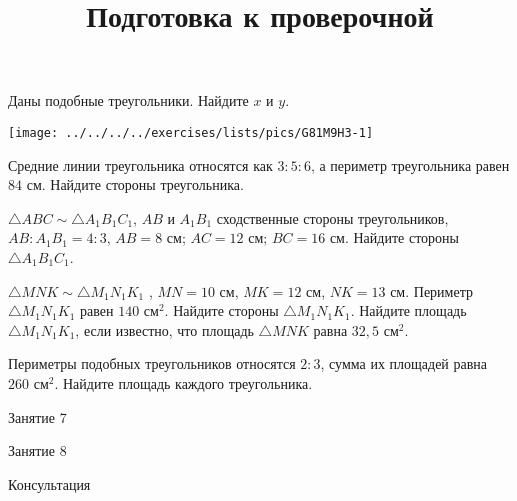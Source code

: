 \begin{homework}[number=3]
	\begin{listofex}
		\item 
		\begin{minipage}[t]{\bodywidth}
			Даны подобные треугольники. Найдите \( x \) и \( y \).
		\end{minipage}
		\hspace{0.02\linewidth}
		\begin{minipage}[t]{\picwidth}
			\texttt{[image: ../../../../exercises/lists/pics/G81M9H3-1]}
		\end{minipage}
		\item Средние линии треугольника относятся как \( 3 : 5 : 6 \), а периметр треугольника равен \( 84 \) см. Найдите стороны треугольника.
		\item \( \triangle ABC \sim \triangle A_1B_1C_1 \), \( AB \) и \( A_1B_1  \) сходственные стороны треугольников, \( AB:A_1B_1=4:3 \), \( AB=8 \) см; \( AC=12 \) см; \( BC=16 \) см. Найдите стороны \( \triangle A_1B_1C_1 \).
		\item \( \triangle MNK \sim \triangle M_1N_1K_1 \) , \( MN=10 \) см, \( MK=12 \) см, \( NK=13 \) см. Периметр \( \triangle M_1N_1K_1 \) равен \( 140 \) см\( ^{2} \). Найдите стороны \( \triangle M_1N_1K_1 \). Найдите площадь \( \triangle M_1N_1K_1 \), если известно, что площадь \( \triangle MNK \) равна \( 32,5 \) см\( ^{2} \).
		\item Периметры подобных треугольников относятся \( 2:3 \), сумма их площадей равна \( 260  \) см\( ^{2} \). Найдите площадь каждого треугольника.
	\end{listofex}
\end{homework}

\begin{class}[number=7]
	\title{Подготовка к проверочной}
	\begin{listofex}
		\item Занятие 7
	\end{listofex}
\end{class}

\begin{class}[number=8]
	\begin{listofex}
		\item Занятие 8
	\end{listofex}
\end{class}

\begin{consultation}[number=7]
	\begin{listofex}
		\item Консультация
	\end{listofex}
\end{consultation}
